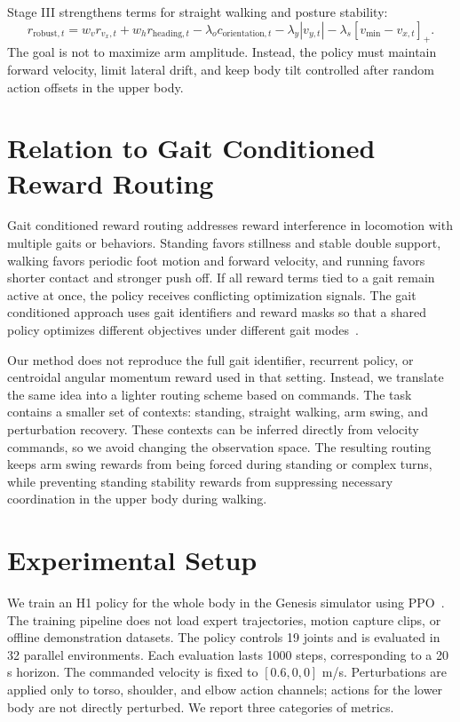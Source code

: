 \documentclass{article}
\newcommand{\relu}[1]{\left[#1\right]_+}
\begin{document}
Stage III strengthens terms for straight walking and posture stability:
\begin{equation}
r_{\mathrm{robust},t}
=
w_v r_{v_x,t}
+ w_h r_{\mathrm{heading},t}
-\lambda_o c_{\mathrm{orientation},t}
-\lambda_y |v_{y,t}|
-\lambda_s \relu{v_{\min}-v_{x,t}} .
\end{equation}
The goal is not to maximize arm amplitude. Instead, the policy must maintain forward velocity, limit lateral drift, and keep body tilt controlled after random action offsets in the upper body.

\section{Relation to Gait Conditioned Reward Routing}

Gait conditioned reward routing addresses reward interference in locomotion with multiple gaits or behaviors. Standing favors stillness and stable double support, walking favors periodic foot motion and forward velocity, and running favors shorter contact and stronger push off. If all reward terms tied to a gait remain active at once, the policy receives conflicting optimization signals. The gait conditioned approach uses gait identifiers and reward masks so that a shared policy optimizes different objectives under different gait modes~\cite{peng2025gait}.

Our method does not reproduce the full gait identifier, recurrent policy, or centroidal angular momentum reward used in that setting. Instead, we translate the same idea into a lighter routing scheme based on commands. The task contains a smaller set of contexts: standing, straight walking, arm swing, and perturbation recovery. These contexts can be inferred directly from velocity commands, so we avoid changing the observation space. The resulting routing keeps arm swing rewards from being forced during standing or complex turns, while preventing standing stability rewards from suppressing necessary coordination in the upper body during walking.

\section{Experimental Setup}

We train an H1 policy for the whole body in the Genesis simulator using PPO~\cite{schulman2017proximal}. The training pipeline does not load expert trajectories, motion capture clips, or offline demonstration datasets. The policy controls 19 joints and is evaluated in 32 parallel environments. Each evaluation lasts 1000 steps, corresponding to a 20 s horizon. The commanded velocity is fixed to $[0.6,0,0]$ m/s. Perturbations are applied only to torso, shoulder, and elbow action channels; actions for the lower body are not directly perturbed. We report three categories of metrics.
\end{document}
